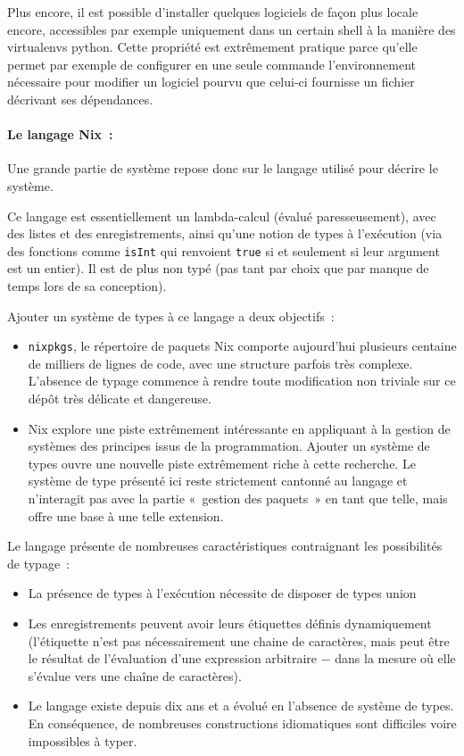 \begin{description}
    Plus encore, il est possible d'installer quelques logiciels de façon plus
    locale encore, accessibles par exemple uniquement dans un certain shell à
    la manière des virtualenvs python. Cette propriété est extrêmement pratique
    parce qu'elle permet par exemple de configurer en une seule commande
    l'environnement nécessaire pour modifier un logiciel pourvu que celui-ci
    fournisse un fichier décrivant ses dépendances.
\end{description}

\paragraph{Le langage Nix :}

Une grande partie de système repose donc sur le langage utilisé pour décrire le
système.

Ce langage est essentiellement un lambda-calcul (évalué paresseusement), avec
des listes et des enregistrements, ainsi qu'une notion de types à l'exécution
(via des fonctions comme \lstinline{isInt} qui renvoient \lstinline{true} si et
seulement si leur argument est un entier).
Il est de plus non typé (pas tant par choix que par manque de temps lors de sa
conception).

Ajouter un système de types à ce langage a deux objectifs :

\begin{itemize}
  \item \texttt{nixpkgs}, le répertoire de paquets Nix comporte aujourd'hui
    plusieurs centaine de milliers de lignes de code, avec une structure
    parfois très complexe.
    L'absence de typage commence à rendre toute modification non triviale sur
    ce dépôt très délicate et dangereuse.
  \item Nix explore une piste extrêmement intéressante en appliquant à la
    gestion de systèmes des principes issus de la programmation. Ajouter un
    système de types ouvre une nouvelle piste extrêmement riche à cette
    recherche. Le système de type présenté ici reste strictement cantonné au
    langage et n'interagit pas avec la partie « gestion des paquets » en tant que
    telle, mais offre une base à une telle extension.
\end{itemize}

Le langage présente de nombreuses caractéristiques contraignant les
possibilités de typage :

\begin{itemize}
  \item La présence de types à l'exécution nécessite de disposer de types union
  \item Les enregistrements peuvent avoir leurs étiquettes définis
    dynamiquement (l'étiquette n'est pas nécessairement une chaine de
    caractères, mais peut être le résultat de l'évaluation d'une expression
    arbitraire − dans la mesure où elle s'évalue vers une chaîne de
    caractères).
  \item Le langage existe depuis dix ans et a évolué en l'absence de système de
    types. En conséquence, de nombreuses constructions idiomatiques sont
    difficiles voire impossibles à typer.
\end{itemize}
